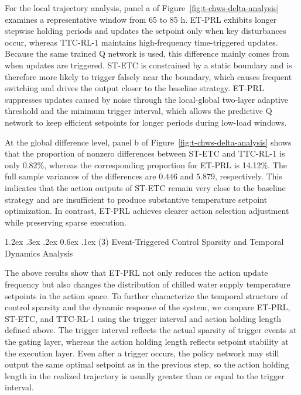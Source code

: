 ﻿\documentclass[preprint,12pt,number]{elsarticle}
\makeatletter
\renewcommand\paragraph{\@startsection{paragraph}{4}{\z@}%
  {1.2ex \@plus .3ex \@minus .2ex}%
  {0.6ex \@plus .1ex}%
  {\normalfont\normalsize}}
\makeatother
\begin{document}
For the local trajectory analysis, panel a of Figure~\ref{fig:t-chws-delta-analysis} examines a representative window from 65 to 85 h. ET-PRL exhibits longer stepwise holding periods and updates the setpoint only when key disturbances occur, whereas TTC-RL-1 maintains high-frequency time-triggered updates. Because the same trained Q network is used, this difference mainly comes from when updates are triggered. ST-ETC is constrained by a static boundary and is therefore more likely to trigger falsely near the boundary, which causes frequent switching and drives the output closer to the baseline strategy. ET-PRL suppresses updates caused by noise through the local-global two-layer adaptive threshold and the minimum trigger interval, which allows the predictive Q network to keep efficient setpoints for longer periods during low-load windows.

At the global difference level, panel b of Figure~\ref{fig:t-chws-delta-analysis} shows that the proportion of nonzero differences between ST-ETC and TTC-RL-1 is only 0.82\%, whereas the corresponding proportion for ET-PRL is 14.12\%. The full sample variances of the differences are \(0.446\) and \(5.879\), respectively. This indicates that the action outputs of ST-ETC remain very close to the baseline strategy and are insufficient to produce substantive temperature setpoint optimization. In contrast, ET-PRL achieves clearer action selection adjustment while preserving sparse execution.

\paragraph{(3) Event-Triggered Control Sparsity and Temporal Dynamics Analysis}\label{event-triggered-control-sparsity-and-temporal-dynamics-analysis}

The above results show that ET-PRL not only reduces the action update frequency but also changes the distribution of chilled water supply temperature setpoints in the action space. To further characterize the temporal structure of control sparsity and the dynamic response of the system, we compare ET-PRL, ST-ETC, and TTC-RL-1 using the trigger interval and action holding length defined above. The trigger interval reflects the actual sparsity of trigger events at the gating layer, whereas the action holding length reflects setpoint stability at the execution layer. Even after a trigger occurs, the policy network may still output the same optimal setpoint as in the previous step, so the action holding length in the realized trajectory is usually greater than or equal to the trigger interval.
\end{document}
